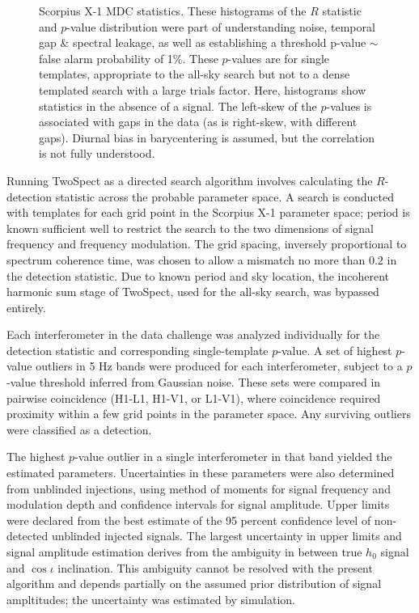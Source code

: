 \begin{figure}
\begin{center}
\caption{Scorpius X-1 MDC statistics. These histograms of the $R$ statistic and $p$-value distribution were part of understanding noise, temporal gap \& spectral leakage, as well as establishing a threshold p-value $\sim$ false alarm probability of 1\%.
These $p$-values are for single templates, appropriate to the all-sky search but not to a dense templated search with a large trials factor.
Here, histograms show statistics in the absence of a signal. 
The left-skew of the $p$-values is associated with gaps in the data (as is right-skew, with different gaps).
Diurnal bias in barycentering is assumed, but the correlation is not fully understood.
}
\end{center}
\end{figure}



Running TwoSpect as a directed search algorithm involves calculating
the $R$-detection statistic across the probable parameter space. 
A search is conducted with templates for each grid point in the Scorpius 
X-1 parameter space; period is known sufficient well to restrict the search
to the two dimensions of signal frequency and frequency modulation. The
grid spacing, inversely proportional to spectrum coherence time, was
chosen to allow a mismatch no more than $0.2$ in the detection statistic.
Due to known period and sky location, the incoherent harmonic sum stage
of TwoSpect, used for the all-sky search, was bypassed entirely. 

Each interferometer in the data challenge was analyzed individually for 
the detection statistic and corresponding single-template $p$-value. A set
of highest $p$-value outliers in 5 Hz bands were produced for each 
interferometer, subject to a $p$-value threshold inferred from Gaussian noise.
These sets were compared in pairwise coincidence (H1-L1, H1-V1, or L1-V1),
where coincidence required proximity within a few grid points in the 
parameter space. Any surviving outliers were classified as a detection. 

The highest $p$-value outlier in a single interferometer in that band 
yielded the estimated parameters. Uncertainties in these parameters were also
determined from unblinded injections, using method of moments for signal
frequency and modulation depth and confidence intervals for signal
amplitude. Upper limits were declared from the best estimate of the 95
percent confidence level of non-detected unblinded injected signals. The
largest uncertainty in upper limits and signal amplitude estimation derives
from the ambiguity in between true $h_0$ signal and $\cos \iota$ inclination.
This ambiguity cannot be resolved with the present algorithm and depends
partially on the assumed prior distribution of signal ampltitudes; the
uncertainty was estimated by simulation.  

